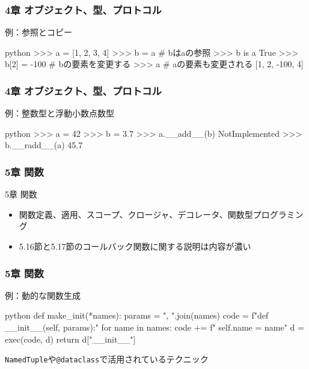\documentclass[aspectratio=169,dvipdfmx,12pt,notheorems]{beamer}
\theoremstyle{definition}
\begin{document}
\begin{frame}[fragile]\frametitle{4章 オブジェクト、型、プロトコル}

\begin{alertblock}{例：参照とコピー}
\begin{pygments}{python}    
>>> a = [1, 2, 3, 4]
>>> b = a  # bはaの参照
>>> b is a
True
>>> b[2] = -100  # bの要素を変更する
>>> a  # aの要素も変更される
[1, 2, -100, 4]
\end{pygments}
\end{alertblock}

\end{frame}

\begin{frame}[fragile]\frametitle{4章 オブジェクト、型、プロトコル}

\begin{exampleblock}{例：整数型と浮動小数点数型}
\begin{pygments}{python}    
>>> a = 42
>>> b = 3.7
>>> a.__add__(b)
NotImplemented
>>> b.__radd__(a)
45.7
\end{pygments}
\end{exampleblock}

\end{frame}

\begin{frame}\frametitle{5章 関数}

\begin{block}{5章 関数}
\begin{itemize}
\item 関数定義、適用、スコープ、クロージャ、デコレータ、関数型プログラミング
\item 5.16節と5.17節のコールバック関数に関する説明は内容が濃い
\end{itemize}
\end{block}

\end{frame}

\begin{frame}[fragile]\frametitle{5章 関数}

\begin{exampleblock}{例：動的な関数生成}
\begin{pygments}{python}    
def make_init(*names):
    params = ", ".join(names)
    code = f"def __init__(self, {params}):\n"
    for name in names:
        code += f"    self.{name} = {name}\n"
    d = {}
    exec(code, d)
    return d["__init__"]
\end{pygments}
\end{exampleblock}
\texttt{NamedTuple}や\texttt{@dataclass}で活用されているテクニック

\end{frame}
\end{document}
